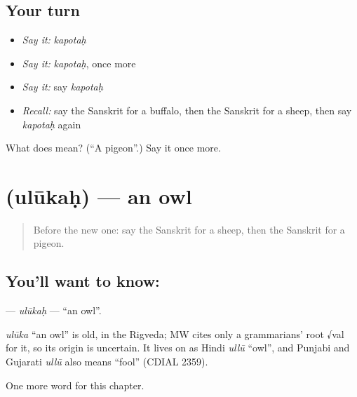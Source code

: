 \subsection*{Your turn}
\begin{itemize}
\raggedright
  \item \emph{Say it:} \emph{kapotaḥ}
  \item \emph{Say it:} \emph{kapotaḥ}, once more
  \item \emph{Say it:} say \emph{kapotaḥ}
  \item \emph{Recall:} say the Sanskrit for a buffalo, then the Sanskrit for a sheep, then say \emph{kapotaḥ} again
\end{itemize}

\begin{tcolorbox}[breakable,colback=teal!4,colframe=teal!35!black,title={Before you move on}]
What does  mean? (\textquotedblleft{}A pigeon\textquotedblright{}.) Say it once more.
\end{tcolorbox}
\section[\texorpdfstring{\sk{उलूकः} (ulūkaḥ)}{उलूकः (ulūkaḥ)}]{ (ulūkaḥ) — an owl}

\label{lesson:SA-C114-ulukah}



\begin{quote}
Before the new one: say the Sanskrit for a sheep, then the Sanskrit for a pigeon.
\end{quote}

\subsection*{You'll want to know: }
\textbf{} — \emph{ulūkaḥ} — \textquotedblleft{}an owl\textquotedblright{}.

\begin{cousinweb}
\emph{ulūka} \textquotedblleft{}an owl\textquotedblright{} is old, in the Rigveda; MW cites only a grammarians' root √val for it, so its origin is uncertain. It lives on as Hindi \emph{ullū} \textquotedblleft{}owl\textquotedblright{}, and Punjabi and Gujarati \emph{ullū} also means \textquotedblleft{}fool\textquotedblright{} (CDIAL 2359).
\end{cousinweb}

\begin{grammarlens}[title={What you've built}]
One more word for this chapter.
\end{grammarlens}

